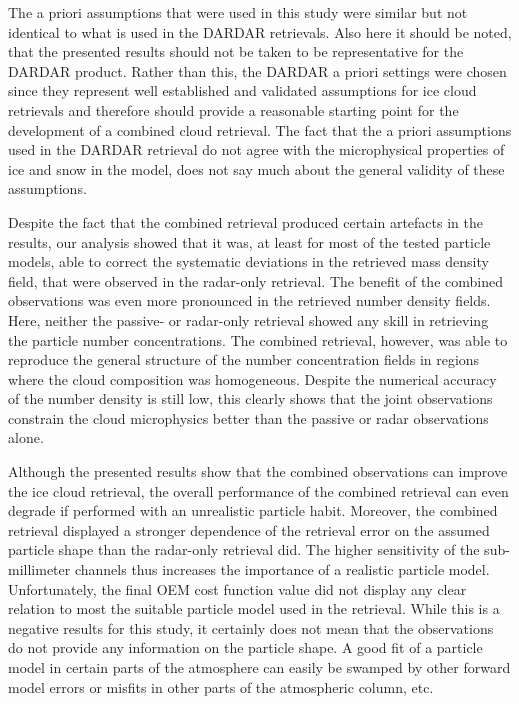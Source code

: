 \documentclass[journal abbreviation, manuscript]{copernicus}
\begin{document}
The a priori assumptions that were used in this study were similar but not
identical to what is used in the DARDAR retrievals. Also here it should be
noted, that the presented results should not be taken to be representative for
the DARDAR product. Rather than this, the DARDAR a priori settings were chosen
since they represent well established and validated assumptions for ice cloud
retrievals and therefore should provide a reasonable starting point for the
development of a combined cloud retrieval. The fact that the a priori
assumptions used in the DARDAR retrieval do not agree with the microphysical
properties of ice and snow in the model, does not say much about the general
validity of these assumptions.

Despite the fact that the combined retrieval produced certain artefacts in the
results, our analysis showed that it was, at least for most of the tested
particle models, able to correct the systematic deviations in the retrieved mass
density field, that were observed in the radar-only retrieval. The benefit of
the combined observations was even more pronounced in the retrieved number
density fields. Here, neither the passive- or radar-only retrieval showed any
skill in retrieving the particle number concentrations. The combined retrieval,
however, was able to reproduce the general structure of the number concentration
fields in regions where the cloud composition was homogeneous. Despite the
numerical accuracy of the number density is still low, this clearly shows that
the joint observations constrain the cloud microphysics better than the passive
or radar observations alone.

Although the presented results show that the combined observations can improve
the ice cloud retrieval, the overall performance of the combined retrieval can
even degrade if performed with an unrealistic particle habit. Moreover, the
combined retrieval displayed a stronger dependence of the retrieval error on the
assumed particle shape than the radar-only retrieval did. The higher sensitivity
of the sub-millimeter channels thus increases the importance of a realistic
particle model. Unfortunately, the final OEM cost function value did not display
any clear relation to most the suitable particle model used in the retrieval.
While this is a negative results for this study, it certainly does not mean that
the observations do not provide any information on the particle shape. A good
fit of a particle model in certain parts of the atmosphere can easily be swamped
by other forward model errors or misfits in other parts of the atmospheric
column, etc.
\end{document}
